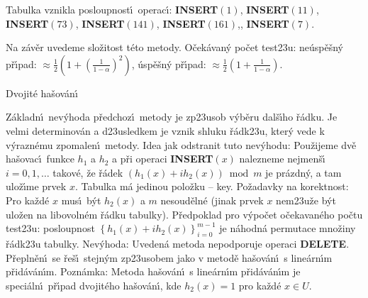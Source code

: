 \flushpar Tabulka vznikla posloupnost\'\i\ operac\'\i :\newline 
{\bf INSERT$\left(1\right)$}, {\bf INSERT$\left(11\right)$}, {\bf INSERT$\left(73\right)$}, 
{\bf INSERT$\left(141\right)$}, {\bf INSERT$\left(161\right)$},, {\bf INSERT$
\left(7\right)$}. 

\flushpar Na z\'av\v er uvedeme slo\v zitost t\'eto metody. O\v cek\'avan\'y 
po\v cet test\accent23u:\newline 
\phantom{---}ne\'usp\v e\v sn\'y p\v r\'\i pad: $\approx\frac 12\left(1+\left(\frac 
1{1-\alpha}\right)^2\right)$, \newline 
\phantom{---}\'usp\v e\v sn\'y p\v r\'\i pad: $\approx\frac 12\left(1+\frac 1{1-\alpha}
\right)$.

\heading
Dvojit\'e ha\v sov\'an\'\i
\endheading

\flushpar Z\'akladn\'\i\ nev\'yhoda p\v redchoz\'\i\ metody je zp\accent23usob 
v\'yb\v eru dal\-\v s\'\i\-ho \v r\'adku. Je velmi determinov\'an a 
d\accent23usledkem je vznik shluku \v r\'adk\accent23u, kter\'y 
vede k v\'yrazn\'emu zpomalen\'\i\ metody. \newline 
Idea jak odstranit tuto nev\'yhodu: Pou\v zijeme dv\v e 
ha\v sovac\'\i\ funkce $h_1$ a $h_2$ a p\v ri operaci {\bf INSERT$
\left(x\right)$ }
nalezneme nejmen\v s\'\i\ $i=0,1,\dots$ takov\'e, \v ze \v r\'adek 
$\left(h_1\left(x\right)+ih_2\left(x\right)\right)\bmod m$ je pr\'azdn\'y, a tam ulo\v z\'\i me 
prvek $x$.\newline 
Tabulka m\'a jedinou polo\v zku -- key.\newline 
Po\v zadavky na korektnost: Pro ka\v zd\'e $x$ mus\'\i\ b\'yt $h_
2\left(x\right)$ a 
$m$ nesoud\v eln\'e (jinak prvek $x$ nem\accent23u\v ze b\'yt ulo\v zen 
na libovoln\'em \v r\'adku tabulky). \newline 
P\v redpoklad pro v\'ypo\v cet o\v cekavan\'eho po\v ctu test\accent23u: posloupnost 
$\left\{h_1\left(x\right)+ih_2\left(x\right)\right\}_{i=0}^{m-1}$ je n\'ahodn\'a permutace mno\v ziny 
\v r\'adk\accent23u tabulky.\newline 
Nev\'yhoda: Uveden\'a metoda nepodporuje operaci {\bf DELETE}. \newline 
P\v repln\v en\'\i\ se \v re\v s\'\i\ stejn\'ym zp\accent23usobem jako v 
metod\v e ha\v sov\'an\'\i\ s line\'arn\'\i m p\v rid\'av\'an\'\i m.\newline 
Pozn\'amka: Metoda ha\v sov\'an\'\i\ s line\'arn\'\i m p\v rid\'av\'an\'\i m je 
speci\'al\-n\'\i\ p\v r\'\i pad dvojit\'eho ha\v sov\'an\'\i , kde $
h_2\left(x\right)=1$ pro 
ka\v zd\'e $x\in U$.
\medskip

